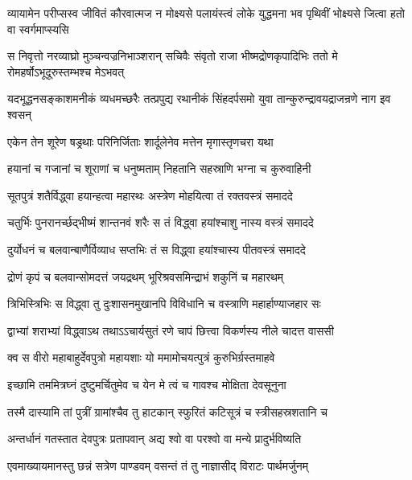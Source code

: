 \threelineshloka
{व्यायामेन परीप्सस्व जीवितं कौरवात्मज}
{न मोक्ष्यसे पलायंस्त्वं लोके युद्धमना भव}
{पृथिवीं भोक्ष्यसे जित्वा हतो वा स्वर्गमाप्स्यसि}


\threelineshloka
{स निवृत्तो नरव्याघ्रो मुञ्चन्वज्रनिभाञ्शरान्}
{सचिवैः संवृतो राजा भीष्मद्रोणकृपादिभिः}
{ततो मे रोमहर्षोऽभूदूरुस्तम्भश्च मेऽभवत्}


\threelineshloka
{यदभूद्धनसङ्काशमनीकं व्यधमच्छरैः}
{तत्प्रपुद्य रथानीकं सिंहदर्पसमो युवा}
{तान्कुरुन्द्रावयद्राजन्रणे नाग इव श्वसन्}


\twolineshloka
{एकेन तेन शूरेण षड्रथाः परिनिर्जिताः}
{शार्दूलेनेव मत्तेन मृगास्तृणचरा यथा}


\twolineshloka
{हयानां च गजानां च शूराणां च धनुष्मताम्}
{निहतानि सहस्राणि भग्ना च कुरुवाहिनी}


\twolineshloka
{सूतपुत्रं शतैर्विद्ध्वा हयान्हत्वा महारथः}
{अस्त्रेण मोहयित्वा तं रक्तवस्त्रं समाददे}


\twolineshloka
{चतुर्भिः पुनरानर्च्छद्भीष्मं शान्तनवं शरैः}
{स तं विद्ध्वा हयांश्चाशु नास्य वस्त्रं समाददे}


\twolineshloka
{दुर्योधनं च बलवान्बाणैर्विव्याध सप्तभिः}
{तं स विद्ध्वा हयांश्चास्य पीतवस्त्रं समाददे}


\twolineshloka
{द्रोणं कृपं च बलवान्सोमदत्तं जयद्रथम्}
{भूरिश्रवसमिन्द्राभं शकुनिं च महारथम्}


\twolineshloka
{त्रिभिस्त्रिभिः स विद्ध्वा तु दुःशासनमुखानपि}
{विविधानि च वस्त्राणि महार्हाण्याजहार सः}


\twolineshloka
{द्वाभ्यां शराभ्यां विद्ध्वाऽथ तथाऽऽचार्यसुतं रणे}
{चापं छित्त्वा विकर्णस्य नीले चादत्त वाससी}




\twolineshloka
{क्व स वीरो महाबाहुर्देवपुत्रो महायशाः}
{यो ममामोचयत्पुत्रं कुरुभिर्ग्रस्तमाहवे}


\twolineshloka
{इच्छामि तममित्रघ्नं दुष्टुमर्चितुमेव च}
{येन मे त्वं च गावश्च मोक्षिता देवसूनुना}


\twolineshloka
{तस्मै दास्यामि तां पुत्रीं ग्रामांश्चैव तु हाटकान्}
{स्फुरितं कटिसूत्रं च स्त्रीसहस्रशतानि च}




\twolineshloka
{अन्तर्धानं गतस्तात देवपुत्रः प्रतापवान्}
{अद्य श्वो वा परश्वो वा मन्ये प्रादुर्भविष्यति}



\twolineshloka
{एवमाख्यायमानस्तु छन्नं सत्रेण पाण्डवम्}
{वसन्तं तं तु नाज्ञासीद् विराटः पार्थमर्जुनम्}


